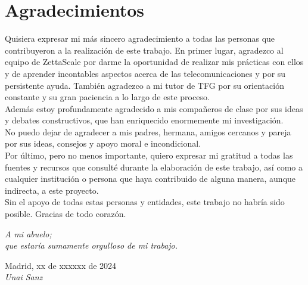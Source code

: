 \cleardoublepage

\chapter*{Agradecimientos}

Quisiera expresar mi más sincero agradecimiento a todas las personas que
contribuyeron a la realización de este trabajo. En primer lugar, agradezco al
equipo de ZettaScale por darme la oportunidad de realizar mis prácticas con
ellos y de aprender incontables aspectos acerca de las telecomunicaciones y por
su persistente ayuda. También agradezco a mi tutor de TFG por su orientación
constante y su gran paciencia a lo largo de este proceso.\\

Además estoy profundamente agradecido a mis compañeros de clase por sus ideas y
debates constructivos, que han enriquecido enormemente mi investigación.\\

No puedo dejar de agradecer a mis padres, hermana, amigos cercanos y pareja por
sus ideas, consejos y apoyo moral e incondicional.\\

Por último, pero no menos importante, quiero expresar mi gratitud a todas las
fuentes y recursos que consulté durante la elaboración de este trabajo, así como
a cualquier institución o persona que haya contribuido de alguna manera, aunque
indirecta, a este proyecto.\\

Sin el apoyo de todas estas personas y entidades, este trabajo no habría sido
posible. Gracias de todo corazón.\\


\begin{flushright}
		\vspace{1.5 cm}
		\emph{A mi abuelo;\\
      		  que estaría sumamente orgulloso de mi trabajo.}\\
		\par
		\vspace{1.0 cm}
		Madrid, xx de xxxxxx de 2024\\ %
		\emph{Unai Sanz}
\end{flushright}

\thispagestyle{empty}


